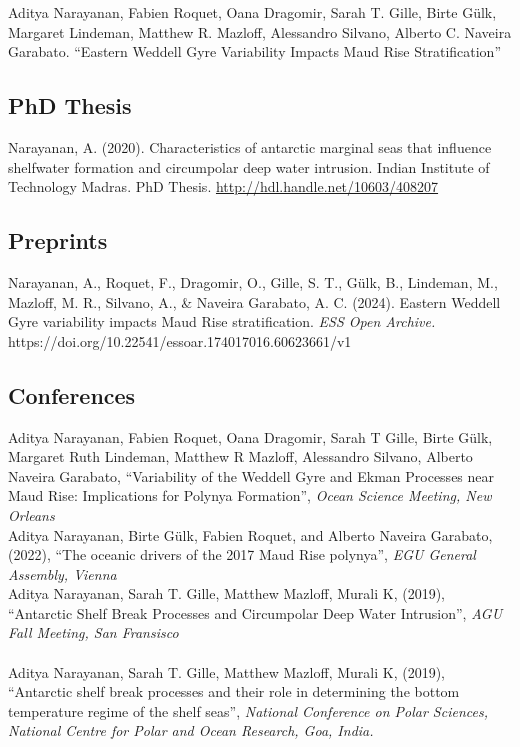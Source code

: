 \documentclass[12pt, a4paper]{article}
\newcommand{\years}[1]{\marginnote{\small #1}}
\begin{document}
\years{2024} Aditya Narayanan, Fabien Roquet, Oana Dragomir, Sarah T. Gille, Birte G\"ulk, Margaret Lindeman, Matthew R. Mazloff, Alessandro Silvano, Alberto C. Naveira Garabato. ``Eastern Weddell Gyre Variability Impacts Maud Rise Stratification''\\


\subsection*{\bf PhD Thesis}

\years{2020} Narayanan, A. (2020). Characteristics of antarctic marginal seas that influence shelfwater formation and circumpolar deep water intrusion. Indian Institute of Technology Madras. PhD Thesis. \url{http://hdl.handle.net/10603/408207}\\


\subsection*{\bf Preprints}

\years{2025} Narayanan, A., Roquet, F., Dragomir, O., Gille, S. T., Gülk, B., Lindeman, M., Mazloff, M. R., Silvano, A., \& Naveira Garabato, A. C. (2024). Eastern Weddell Gyre variability impacts Maud Rise stratification. {\em ESS Open Archive.} https://doi.org/10.22541/essoar.174017016.60623661/v1

\subsection*{\bf Conferences}
\years{2024} Aditya Narayanan, Fabien Roquet, Oana Dragomir, Sarah T Gille, Birte Gülk, Margaret Ruth Lindeman, Matthew R Mazloff, Alessandro Silvano, Alberto Naveira Garabato, ``Variability of the Weddell Gyre and Ekman Processes near Maud Rise: Implications for Polynya Formation'', \emph{Ocean Science Meeting, New Orleans}\\
\years{2022}Aditya Narayanan, Birte G\"ulk, Fabien Roquet, and Alberto Naveira Garabato, (2022), ``The oceanic drivers of the 2017 Maud Rise polynya'', \emph{EGU General Assembly, Vienna}\\
\years{2019}Aditya Narayanan, Sarah T. Gille, Matthew Mazloff, Murali K, (2019), ``Antarctic Shelf Break Processes and Circumpolar Deep Water Intrusion'', \emph{AGU Fall Meeting, San Fransisco}\\
\\
\years{2019}Aditya Narayanan, Sarah T. Gille, Matthew Mazloff, Murali K, (2019), ``Antarctic shelf break processes and their role in determining the bottom temperature regime of the shelf seas'', \emph{National Conference on Polar Sciences, National Centre for Polar and Ocean Research, Goa, India.}\\
\end{document}
